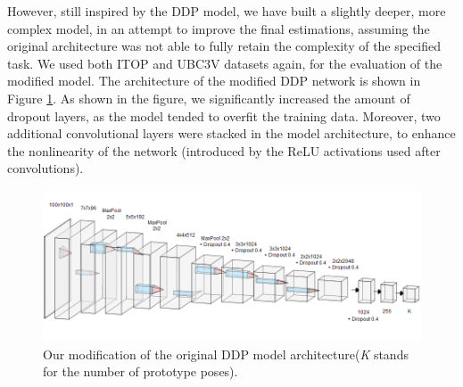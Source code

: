 \noindent
However, still inspired by the DDP model, we have built a slightly deeper, more complex model, in an attempt to improve the final estimations, assuming the original architecture was not able to fully retain the complexity of the specified task. We used both ITOP and UBC3V datasets again, for the evaluation of the modified model.
The architecture of the modified DDP network is shown in Figure \ref{fig:mddp}. As shown in the figure, we significantly increased the amount of dropout layers, as the model tended to overfit the training data. Moreover, two additional convolutional layers were stacked in the model architecture, to enhance the nonlinearity of the network (introduced by the ReLU activations used after convolutions).\par
\vspace{5mm}

\begin{figure}[H]
\begin{center}
  \includegraphics[width=\textwidth]{images/implementation/mddp.png}
  \caption[Our modification of the original DDP model architecture.]{Our modification of the original DDP model architecture\break (\textit{K} stands for the number of prototype poses).}
  \label{fig:mddp}
\end{center}
\end{figure}


